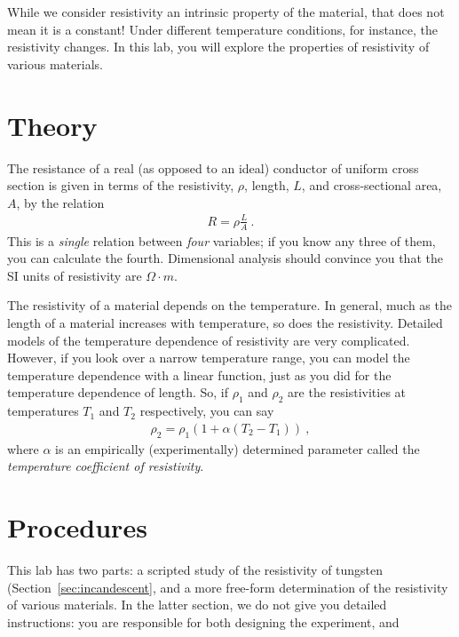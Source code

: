 \documentclass[12pt]{article}
\begin{document}
While we consider resistivity an intrinsic property of the material,
that does not mean it is a constant!  Under different temperature
conditions, for instance, the resistivity changes.  In this lab, you
will explore the properties of resistivity of various materials.

\section{Theory}
\label{sec:theory}

The resistance of a real (as opposed to an ideal) conductor of uniform
cross section is given in terms of the resistivity, $\rho$, length,
$L$, and cross-sectional area, $A$, by the relation
\begin{gather}
  R = \rho \frac{L}{A}\ .
\label{eq:resistivity}
\end{gather}
This is a \textit{single} relation between \textit{four} variables; if
you know any three of them, you can calculate the fourth.  Dimensional
analysis should convince you that the SI units of resistivity are
$\unit{\Omega \cdot m}$.

The resistivity of a material depends on the temperature.  In general,
much as the length of a material increases with temperature, so does
the resistivity.  Detailed models of the temperature dependence of
resistivity are very complicated.  However, if you look over a narrow
temperature range, you can model the temperature dependence with a
linear function, just as you did for the temperature dependence of
length. So, if $\rho_1$ and $\rho_2$ are the resistivities at
temperatures $T_1$ and $T_2$ respectively, you can say
\begin{gather*}
  \rho_2 = \rho_1 \left(1 + \alpha (T_2 - T_1) \right)\ ,
\end{gather*}
where $\alpha$ is an empirically (experimentally) determined
parameter called the \textit{temperature coefficient of resistivity}.

\section{Procedures}
\label{sec:procedures}

This lab has two parts: a scripted study of the resistivity of
tungsten (Section~\ref{sec:incandescent}, and a more free-form
determination of the resistivity of various materials.  In the latter
section, we do not give you detailed instructions: you are responsible
for both designing the experiment, and 
\end{document}
